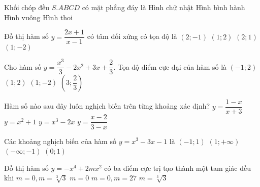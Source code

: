 \begin{ex}%
Khối chóp đều $S.ABCD$ có mặt phẳng đáy là
\choice
{Hình chữ nhật}
{Hình bình hành}
{\True Hình vuông}
{Hình thoi}
\end{ex}

\begin{ex}%
Đồ thị hàm số $y=\dfrac{2x+1}{x-1}$ có tâm đối xứng có tọa độ là
\choice
{$(2;-1)$}
{\True $(1;2)$}
{$(2;1)$}
{$(1;-2)$}
\end{ex}

\begin{ex}%
Cho hàm số $y=\dfrac{x^3}{3}-2x^2+3x+\dfrac{2}{3}$. Tọa độ điểm cực đại của hàm số là
\choice
{$(-1;2)$}
{\True $(1;2)$}
{$(1;-2)$}
{$(3;\dfrac{2}{3})$}
\end{ex}

\begin{ex}%
Hàm số nào sau đây luôn nghịch biến trên từng khoảng xác định?
\choice
{\True $y=\dfrac{1-x}{x+3}$}
{$y=x^2+1$}
{$y=x^3-2x$}
{$y=\dfrac{x-2}{3-x}$}
\end{ex}

\begin{ex}%
Các khoảng nghịch biến của hàm số $y=x^3-3x-1$ là
\choice
{\True $(-1;1)$}
{$(1;+\infty)$}
{$(-\infty;-1)$}
{$(0;1)$}
\end{ex}

\begin{ex}%
Đồ thị hàm số $y=-x^4+2mx^2$ có ba điểm cực trị tạo thành một tam giác đều khi
\choice
{$m=0,m=\sqrt[3]{3}$}
{$m=0$}
{$m=0,m=27$}
{\True $m=\sqrt[3]{3}$}
\end{ex}

